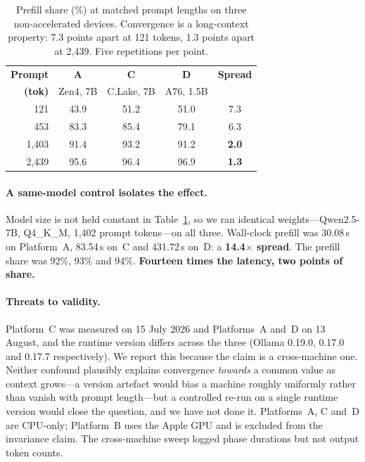\documentclass[sigconf,nonacm,10pt]{acmart}
\begin{document}
\begin{table}[t]
\caption{Prefill share (\%) at matched prompt lengths on three non-accelerated devices. Convergence is a
long-context property: 7.3 points apart at 121 tokens, 1.3 points apart at 2{,}439. Five repetitions per point.}
\label{tab:invariance}
\footnotesize
\setlength{\tabcolsep}{4pt}
\begin{tabular}{@{}rcccc@{}}
\toprule
\textbf{Prompt} & \textbf{A} & \textbf{C} & \textbf{D} & \textbf{Spread} \\
\textbf{(tok)} & \scriptsize Zen4, 7B & \scriptsize C.Lake, 7B & \scriptsize A76, 1.5B & \\
\midrule
121     & 43.9 & 51.2 & 51.0 & 7.3 \\
453     & 83.3 & 85.4 & 79.1 & 6.3 \\
1{,}403 & 91.4 & 93.2 & 91.2 & \textbf{2.0} \\
2{,}439 & 95.6 & 96.4 & 96.9 & \textbf{1.3} \\
\bottomrule
\end{tabular}
\end{table}

\paragraph{A same-model control isolates the effect.} Model size is not held constant in
Table~\ref{tab:invariance}, so we ran identical weights---Qwen2.5-7B, Q4\_K\_M, 1{,}402 prompt tokens---on all
three. Wall-clock prefill was 30.08\,s on Platform~A, 83.54\,s on~C and 431.72\,s on~D: a \textbf{14.4$\times$
spread}. The prefill share was 92\%, 93\% and 94\%. \textbf{Fourteen times the latency, two points of share.}

\paragraph{Threats to validity.} Platform~C was measured on 15 July 2026 and Platforms~A and~D on 13 August,
and the runtime version differs across the three (Ollama 0.19.0, 0.17.0 and 0.17.7 respectively). We report
this because the claim is a cross-machine one. Neither confound plausibly explains convergence \emph{towards} a
common value as context grows---a version artefact would bias a machine roughly uniformly rather than vanish
with prompt length---but a controlled re-run on a single runtime version would close the question, and we have
not done it. Platforms~A, C and~D are CPU-only; Platform~B uses the Apple GPU and is excluded from the
invariance claim. The cross-machine sweep logged phase durations but not output token counts.
\end{document}

